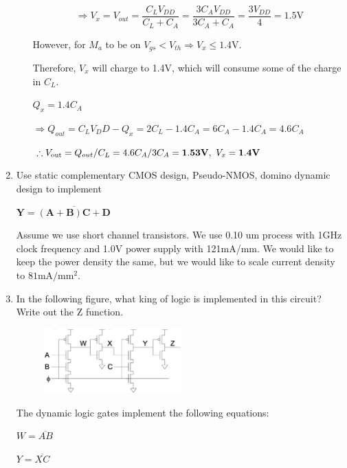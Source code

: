\documentclass[fleqn]{article}
\begin{document}
\begin{enumerate}
\begin{enumerate}
			\begin{equation*}
				\Rightarrow V_x = V_{out} = \frac{C_LV_{DD}}{C_L + C_A} = \frac{3C_AV_{DD}}{3C_A + C_A} = \frac{3V_{DD}}{4} = 1.5\text{V}
			\end{equation*}
			
			 However, for $M_a$ to be on $V_{gs} < V_{th} \Rightarrow V_x \leq 1.4\text{V}$.
			
			Therefore, $V_x$ will charge to 1.4V, which will consume some of the charge in $C_L$.
			
			$Q_x = 1.4C_A$
			
			$\Rightarrow Q_{out} = C_LV_DD - Q_x = 2C_L - 1.4C_A = 6C_A - 1.4C_A = 4.6C_A$
			
			$\therefore V_\text{out} = Q_{out}/C_L = 4.6C_A/3C_A = \mathbf{1.53\text{\textbf{V}}},\ V_x = \mathbf{1.4\text{\textbf{V}}}$
			
			\end{enumerate}
		
		\item Use static complementary CMOS design, Pseudo-NMOS, domino dynamic design to implement
		
		$\mathbf{Y = \overline{(A + B)C + D}}$
		
		Assume we use short channel transistors. We use 0.10 um process with 1GHz clock frequency and 1.0V power supply with 121mA/mm. We would like to keep the power density the same, but we would like to scale current density to $81\text{mA}/\text{mm}^2$.
		
		\item In the following figure, what king of logic is implemented in this circuit? Write out the Z function.
		
			\begin{figure}[H]
				\centerline{\includegraphics[width=0.5\textwidth]{circuit_question3.png}}
				\label{fig::circuit_question3}
			\end{figure}

			The dynamic logic gates implement the following equations:
			
			$W = \overline{AB}$
			
			$Y = \overline{XC}$
			

\end{enumerate}
\end{document}
